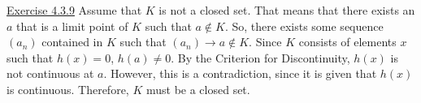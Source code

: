\documentclass{exam}
\begin{document}
\underline{Exercise 4.3.9}
\newline
\newline
Assume that $K$ is not a closed set. That means that there exists an $a$ that is a limit point of $K$ such that $a\notin K$. So, there exists some sequence $(a_n)$ contained in $K$ such that $(a_n)\to a\notin K$. Since $K$ consists of elements $x$ such that $h(x)=0$, $h(a)\ne0$. By the Criterion for Discontinuity, $h(x)$ is not continuous at $a$. However, this is a contradiction, since it is given that $h(x)$ is continuous. Therefore, $K$ must be a closed set.
\end{document}
